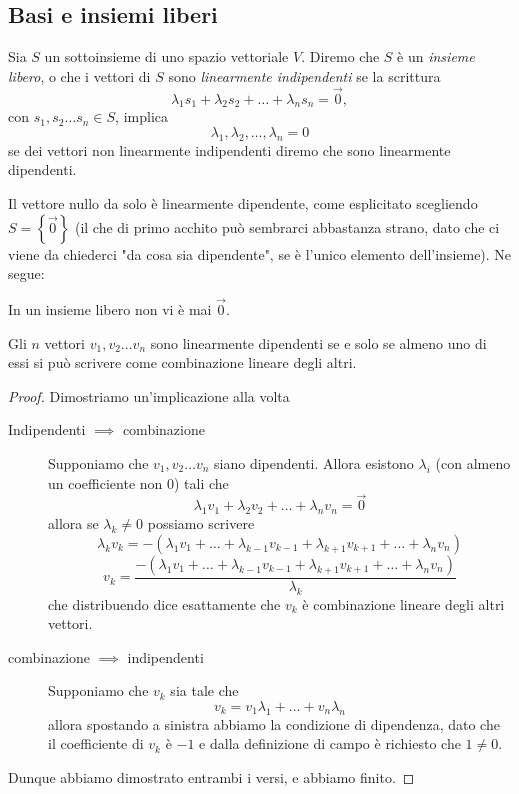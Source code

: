 \documentclass[11pt]{scrartcl}
\begin{document}
	\subsection{Basi e insiemi liberi}
	
	\begin{definition}
		Sia $S$ un sottoinsieme di uno spazio vettoriale $V$. Diremo che $S$ è un \textit{insieme libero}, o che i vettori di $S$ sono \textit{linearmente indipendenti} se la scrittura
		$$\lambda_1s_1+\lambda_2s_2+\dots+\lambda_ns_n=\vec{0},$$
		con $s_1,s_2\dots s_n\in S$, implica
		$$\lambda_1,\lambda_2,\dots,\lambda_n=0$$
		se dei vettori non linearmente indipendenti diremo che sono linearmente dipendenti.
	\end{definition}
	Il vettore nullo da solo è linearmente dipendente, come esplicitato scegliendo $S=\left\{\vec{0}\right\}$ (il che di primo acchito può sembrarci abbastanza strano, dato che ci viene da chiederci "da cosa sia dipendente", se è l'unico elemento dell'insieme). Ne segue:
	\begin{remark}
		In un insieme libero non vi è mai $\vec{0}$.
	\end{remark}
	\begin{theorem}
		Gli $n$ vettori $v_1,v_2\dots v_n$ sono linearmente dipendenti se e solo se almeno uno di essi si può scrivere come combinazione lineare degli altri.
	\end{theorem}
	\begin{proof}
		Dimostriamo un'implicazione alla volta
		\begin{description}
			\item[Indipendenti $\implies$ combinazione] Supponiamo che $v_1,v_2\dots v_n$ siano dipendenti. Allora esistono $\lambda_i$ (con almeno un coefficiente non $0$) tali che 
			$$\lambda_1v_1+\lambda_2v_2+\dots+\lambda_nv_n=\vec{0}$$
			allora se $\lambda_k\ne 0$ possiamo scrivere
			$$\lambda_kv_k=-(\lambda_1v_1+\dots+\lambda_{k-1}v_{k-1}+\lambda_{k+1}v_{k+1}+\dots+\lambda_nv_n)$$
			$$v_k=\frac{-(\lambda_1v_1+\dots+\lambda_{k-1}v_{k-1}+\lambda_{k+1}v_{k+1}+\dots+\lambda_nv_n)}{\lambda_k}$$
			che distribuendo dice esattamente che $v_k$ è combinazione lineare degli altri vettori.
			\item[combinazione $\implies$ indipendenti] Supponiamo che $v_k$ sia tale che 
			$$v_k=v_1\lambda_1+\dots+v_n\lambda_n$$
			allora spostando a sinistra abbiamo la condizione di dipendenza, dato che il coefficiente di $v_k$ è $-1$ e dalla definizione di campo è richiesto che $1\ne 0$.
		\end{description}
		Dunque abbiamo dimostrato entrambi i versi, e abbiamo finito.
	\end{proof}
\end{document}
